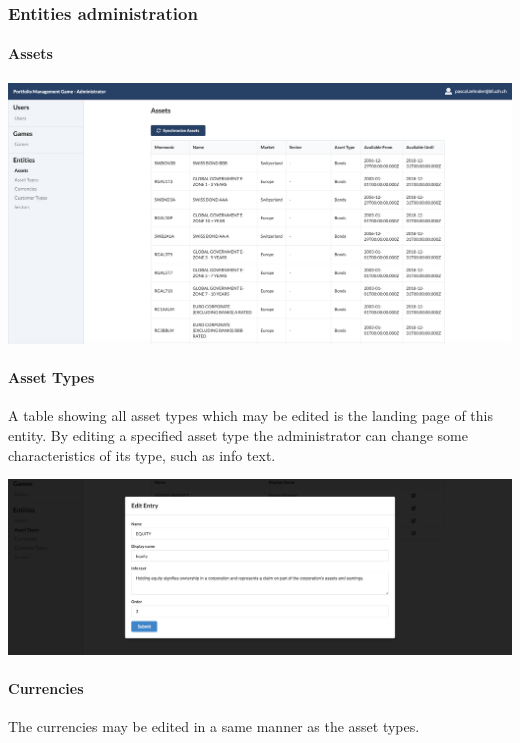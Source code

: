 \subsubsection{Entities administration}

\paragraph{Assets}
\begin{center}
  \includegraphics[scale=0.2]{img/application-overview/administrator/entities_assets.png}
\end{center}

\paragraph{Asset Types}
A table showing all asset types which may be edited is the landing page of this entity. By editing a specified asset type the administrator can change some characteristics of its type, such as info text.
\begin{center}
  \includegraphics[scale=0.2]{img/application-overview/administrator/entities_asset_types.png}
\end{center}

\paragraph{Currencies}
The currencies may be edited in a same manner as the asset types.

